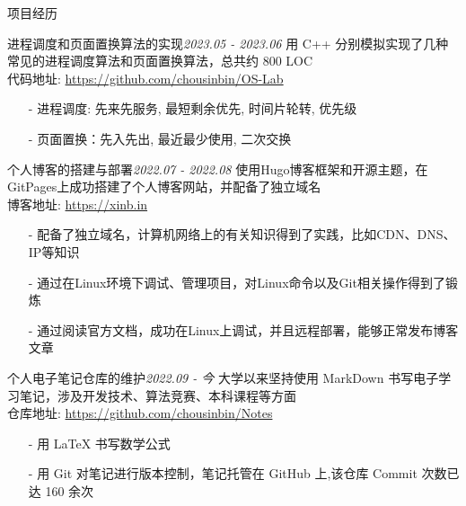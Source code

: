 \documentclass{resume} %
\begin{document}
\begin{rSection}{项目经历}

\begin{rSubsection}{进程调度和页面置换算法的实现}{\em 2023.05 - 2023.06}
{用 C++ 分别模拟实现了几种常见的进程调度算法和页面置换算法，总共约 800 LOC\\}
{代码地址: \rm \url{https://github.com/chousinbin/OS-Lab}}
\item[]
\begin{itemize}
\setlength\itemsep{-0.5em}
\item[-] 进程调度: 先来先服务, 最短剩余优先, 时间片轮转, 优先级
\item[-] 页面置换：先入先出, 最近最少使用, 二次交换
\end{itemize}
\end{rSubsection}

\begin{rSubsection}{个人博客的搭建与部署}{\em 2022.07 - 2022.08}
{使用Hugo博客框架和开源主题，在GitPages上成功搭建了个人博客网站，并配备了独立域名\\}
{博客地址: \rm \url{https://xinb.in}}
\item[]
\begin{itemize}
\setlength\itemsep{-0.5em}
\item[-] 配备了独立域名，计算机网络上的有关知识得到了实践，比如CDN、DNS、IP等知识
\item[-] 通过在Linux环境下调试、管理项目，对Linux命令以及Git相关操作得到了锻炼
\item[-] 通过阅读官方文档，成功在Linux上调试，并且远程部署，能够正常发布博客文章
\end{itemize}
\end{rSubsection}

\begin{rSubsection}{个人电子笔记仓库的维护}{\em 2022.09 - 今}
{大学以来坚持使用 MarkDown 书写电子学习笔记，涉及开发技术、算法竞赛、本科课程等方面\\}
{仓库地址: \rm \url{https://github.com/chousinbin/Notes}}
\item[]
\begin{itemize}
\setlength\itemsep{-0.5em}
\item[-] 用 \LaTeX{} 书写数学公式
\item[-] 用 Git 对笔记进行版本控制，笔记托管在 GitHub 上,该仓库 Commit 次数已达 160 余次
\end{itemize}
\end{rSubsection}

\end{rSection}
\end{document}
